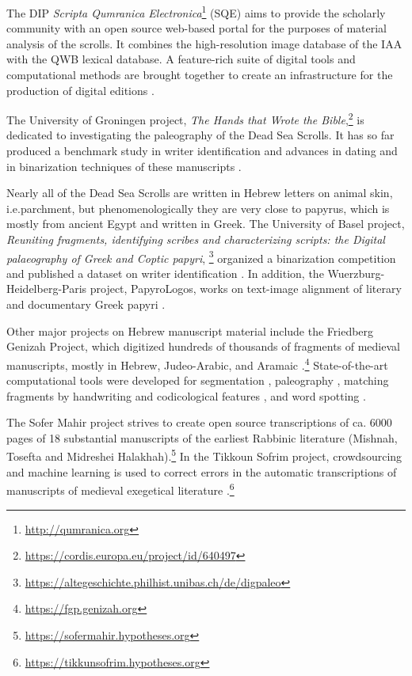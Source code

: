 The DIP \textit{Scripta Qumranica
Electronica}\footnote{\url{http://qumranica.org}} (SQE) 
aims to provide the scholarly community with an open source web-based portal
for the purposes of material analysis of the  scrolls.  It combines the
high-resolution image database of the IAA with the QWB lexical database.  A
feature-rich suite of digital tools and computational methods are brought
together to create an infrastructure for the production of digital editions
\cite{SQE}. %

The University of Groningen 
project, \textit{The Hands that Wrote the
Bible},\footnote{\url{https://cordis.europa.eu/project/id/640497}} is dedicated
to investigating the paleography of the Dead Sea Scrolls.  It has so far
produced a benchmark study in writer identification \cite {DhaliEtAl2017} and
advances in dating \cite{DhaliEtAl2020dating} and in binarization techniques of
these manuscripts \cite{DhaliEtAl2019}.

Nearly all of the Dead Sea Scrolls are written in Hebrew letters on animal
skin, i.e.\@ parchment, but phenomenologically they are very close to papyrus,
which is mostly from ancient Egypt and written in Greek.  The University of
Basel 
project, \textit{Reuniting fragments, identifying scribes and characterizing
scripts: the Digital palaeography of Greek and Coptic papyri},%
\footnote{\url{https://altegeschichte.philhist.unibas.ch/de/digpaleo}}
organized a binarization competition \cite{Pratikakis2019} and published a
dataset on writer identification \cite{Mohammed2019b}.  In addition, the
Wuerzburg-Heidelberg-Paris project, PapyroLogos, works on text-image alignment
of literary and documentary Greek papyri \cite{KiesslingStoekl2019}.

Other major projects on Hebrew manuscript material include the 
Friedberg Genizah Project, which digitized hundreds of thousands of fragments
of medieval manuscripts, mostly in Hebrew, Judeo-Arabic, and Aramaic
\cite{FGP}.\footnote{\url{https://fgp.genizah.org}} State-of-the-art
computational tools were developed for segmentation \cite{Catalog}, paleography
\cite{Paleo}, matching fragments by handwriting and codicological features
\cite{Join}, and word spotting \cite{Spot}. 

The Sofer Mahir project strives to create open source transcriptions of ca.\@
6000 pages of 18 substantial manuscripts of the earliest Rabbinic literature
(Mishnah, Tosefta and Midreshei
Halakhah).\footnote{\url{https://sofermahir.hypotheses.org}} In the Tikkoun
Sofrim project,  crowdsourcing and machine learning is used to correct errors
in the automatic transcriptions of manuscripts of medieval exegetical
literature
\cite{kuflik2019tikkoun}.\footnote{\url{https://tikkunsofrim.hypotheses.org}}

